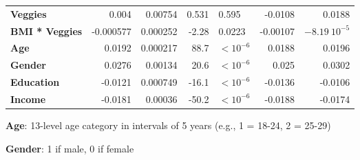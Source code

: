 \documentclass[11pt]{article}
\begin{document}
\begin{table}[h]
\begin{threeparttable}
{\begin{tabular}{lrrrlrr}
\textbf{Veggies} & \raisebox{2ex}{\hypertarget{D5a}{}}0.004 & \raisebox{2ex}{\hypertarget{D5b}{}}0.00754 & \raisebox{2ex}{\hypertarget{D5c}{}}0.531 & \raisebox{2ex}{\hypertarget{D5d}{}}0.595 & \raisebox{2ex}{\hypertarget{D5e}{}}-0.0108 & \raisebox{2ex}{\hypertarget{D5f}{}}0.0188 \\
\textbf{BMI * Veggies} & \raisebox{2ex}{\hypertarget{D6a}{}}-0.000577 & \raisebox{2ex}{\hypertarget{D6b}{}}0.000252 & \raisebox{2ex}{\hypertarget{D6c}{}}-2.28 & \raisebox{2ex}{\hypertarget{D6d}{}}0.0223 & \raisebox{2ex}{\hypertarget{D6e}{}}-0.00107 & \raisebox{2ex}{\hypertarget{D6f}{}}$-8.19\ 10^{-5}$ \\
\textbf{Age} & \raisebox{2ex}{\hypertarget{D7a}{}}0.0192 & \raisebox{2ex}{\hypertarget{D7b}{}}0.000217 & \raisebox{2ex}{\hypertarget{D7c}{}}88.7 & $<$\raisebox{2ex}{\hypertarget{D7d}{}}$10^{-6}$ & \raisebox{2ex}{\hypertarget{D7e}{}}0.0188 & \raisebox{2ex}{\hypertarget{D7f}{}}0.0196 \\
\textbf{Gender} & \raisebox{2ex}{\hypertarget{D8a}{}}0.0276 & \raisebox{2ex}{\hypertarget{D8b}{}}0.00134 & \raisebox{2ex}{\hypertarget{D8c}{}}20.6 & $<$\raisebox{2ex}{\hypertarget{D8d}{}}$10^{-6}$ & \raisebox{2ex}{\hypertarget{D8e}{}}0.025 & \raisebox{2ex}{\hypertarget{D8f}{}}0.0302 \\
\textbf{Education} & \raisebox{2ex}{\hypertarget{D9a}{}}-0.0121 & \raisebox{2ex}{\hypertarget{D9b}{}}0.000749 & \raisebox{2ex}{\hypertarget{D9c}{}}-16.1 & $<$\raisebox{2ex}{\hypertarget{D9d}{}}$10^{-6}$ & \raisebox{2ex}{\hypertarget{D9e}{}}-0.0136 & \raisebox{2ex}{\hypertarget{D9f}{}}-0.0106 \\
\textbf{Income} & \raisebox{2ex}{\hypertarget{D10a}{}}-0.0181 & \raisebox{2ex}{\hypertarget{D10b}{}}0.00036 & \raisebox{2ex}{\hypertarget{D10c}{}}-50.2 & $<$\raisebox{2ex}{\hypertarget{D10d}{}}$10^{-6}$ & \raisebox{2ex}{\hypertarget{D10e}{}}-0.0188 & \raisebox{2ex}{\hypertarget{D10f}{}}-0.0174 \\
\bottomrule
\end{tabular}}
\begin{tablenotes}
\footnotesize
\item \textbf{Age}: 13-level age category in intervals of 5 years (e.g., 1 = 18-24, 2 = 25-29)
\item \textbf{Gender}: 1 if male, 0 if female

\end{tablenotes}
\end{threeparttable}
\end{table}
\end{document}
